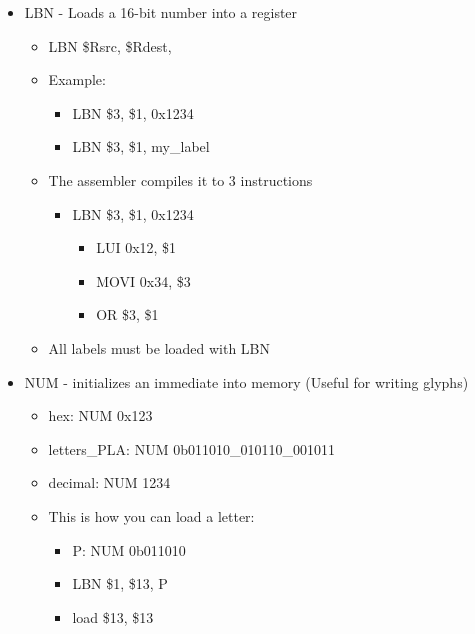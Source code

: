 \documentclass[letterpaper, 11 pt, conference]{article}
\begin{document}
\begin{itemize}
    \item LBN - Loads a 16-bit number into a register

\begin{itemize}
        \item LBN \$Rsrc, \$Rdest,

        \item Example:
\begin{itemize}
            \item LBN \$3, \$1, 0x1234
            \item LBN \$3, \$1, my\_label
\end{itemize}

        \item The assembler compiles it to 3 instructions
\begin{itemize}
            \item LBN \$3, \$1, 0x1234
\begin{itemize}
                \item LUI 0x12, \$1
                \item MOVI 0x34, \$3
                \item OR \$3, \$1
\end{itemize}
\end{itemize}
        \item All labels must be loaded with LBN

\end{itemize}
    \item NUM - initializes an immediate into memory (Useful for writing glyphs)
\begin{itemize}
        \item hex: NUM 0x123
        \item letters\_PLA: NUM 0b011010\_010110\_001011

        \item decimal: NUM 1234

        \item This is how you can load a letter:
\begin{itemize}
            \item P: NUM 0b011010
            \item LBN \$1, \$13, P
            \item load \$13, \$13
\end{itemize}
\end{itemize}

\end{itemize}
\end{document}
